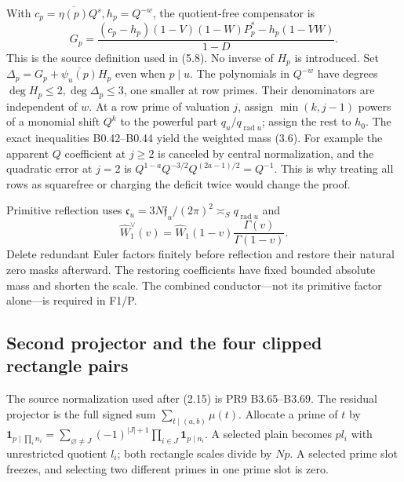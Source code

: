 \documentclass[11pt,a4paper]{article}
\begin{document}
With \(c_p=\overline{\eta(p)}Q^s,h_p=Q^{-w}\), the quotient-free
compensator is \[
G_p=
\frac{(c_p-h_p)(1-V)(1-W)P_p^*-h_p(1-VW)}{1-D}.
\] This is the source definition used in (5.8). No inverse of \(H_p\) is
introduced. Set \(\Delta_p=G_p+\overline{\psi_u(p)}H_p\) even when
\(p\mid u\). The polynomials in \(Q^{-w}\) have degrees
\(\deg H_p\le2,\deg\Delta_p\le3\), one smaller at row primes. Their
denominators are independent of \(w\). At a row prime of valuation
\(j\), assign \(\min(k,j-1)\) powers of a monomial shift \(Q^k\) to the
powerful part \(q_u/q_{\operatorname{rad}u}\); assign the rest to
\(h_0\). The exact inequalities B0.42--B0.44 yield the weighted mass
(3.6). For example the apparent \(Q\) coefficient at \(j\ge2\) is
canceled by central normalization, and the quadratic error at \(j=2\) is
\(Q^{1-a}Q^{-3/2}Q^{(2a-1)/2}=Q^{-1}\). This is why treating all rows as
squarefree or charging the deficit twice would change the proof.

Primitive reflection uses
\(\mathfrak c_u=3N\mathfrak f_u/(2\pi)^2\asymp_S q_{\operatorname{rad}u}\)
and \[
\widehat W_1^\vee(v)=
\widehat W_1(1-v)\frac{\Gamma(v)}{\Gamma(1-v)}.
\] Delete redundant Euler factors finitely before reflection and restore
their natural zero masks afterward. The restoring coefficients have
fixed bounded absolute mass and shorten the scale. The combined
conductor---not its primitive factor alone---is required in F1/P.

\hypertarget{second-projector-and-the-four-clipped-rectangle-pairs}{%
\subsection{Second projector and the four clipped rectangle
pairs}\label{second-projector-and-the-four-clipped-rectangle-pairs}}

The source normalization used after (2.15) is PR9 B3.65--B3.69. The
residual projector is the full signed sum \(\sum_{t\mid(a,b)}\mu(t)\).
Allocate a prime of \(t\) by
\(\mathbf1_{p\mid\prod_i n_i} =\sum_{\varnothing\ne J}(-1)^{|J|+1} \prod_{i\in J}\mathbf1_{p\mid n_i}\).
A selected plain becomes \(pl_i\) with unrestricted quotient \(l_i\);
both rectangle scales divide by \(Np\). A selected prime slot freezes,
and selecting two different primes in one prime slot is zero.
\end{document}
